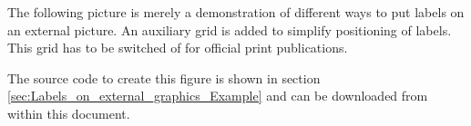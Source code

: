 
The following picture is merely a demonstration of different ways to put labels on an external picture. An auxiliary grid is added to simplify positioning of labels. This grid has to be switched of for official print publications.



The source code to create this figure is shown in section \ref{sec:Labels_on_external_graphics_Example} and can be downloaded from within this document.